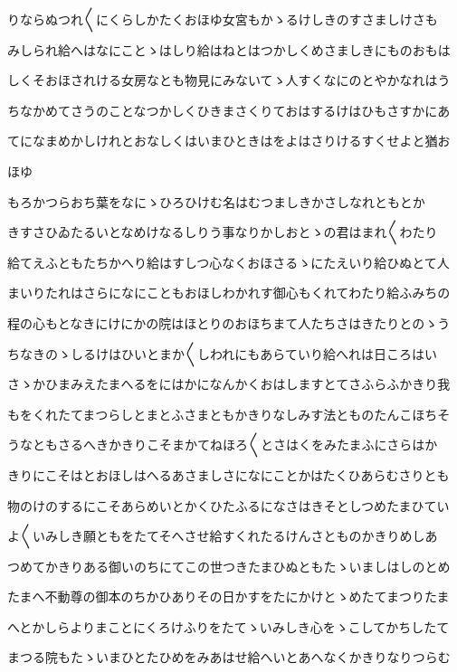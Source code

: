 \documentclass[a4paper,11pt,landscape]{ltjtarticle}
\begin{document}
\par\medskip
りならぬつれ〱にくらしかたくおほゆ女宮もかゝるけしきのすさましけさも
\par\medskip
みしられ給へはなにことゝはしり給はねとはつかしくめさましきにものおもは
\par\medskip
しくそおほされける女房なとも物見にみないてゝ人すくなにのとやかなれはう
\par\medskip
ちなかめてさうのことなつかしくひきまさくりておはするけはひもさすかにあ
\par\medskip
てになまめかしけれとおなしくはいまひときはをよはさりけるすくせよと猶お
\par\medskip
ほゆ
\par\medskip
もろかつらおち葉をなにゝひろひけむ名はむつましきかさしなれともとか
\par\medskip
きすさひゐたるいとなめけなるしりう事なりかしおとゝの君はまれ〱わたり
\par\medskip
給てえふともたちかへり給はすしつ心なくおほさるゝにたえいり給ひぬとて人
\par\medskip
まいりたれはさらになにこともおほしわかれす御心もくれてわたり給ふみちの
\par\medskip
程の心もとなきにけにかの院はほとりのおほちまて人たちさはきたりとのゝう
\par\medskip
ちなきのゝしるけはひいとまか〱しわれにもあらていり給へれは日ころはい
\par\medskip
さゝかひまみえたまへるをにはかになんかくおはしますとてさふらふかきり我
\par\medskip
もをくれたてまつらしとまとふさまともかきりなしみす法とものたんこほちそ
\par\medskip
うなともさるへきかきりこそまかてねほろ〱とさはくをみたまふにさらはか
\par\medskip
きりにこそはとおほしはへるあさましさになにことかはたくひあらむさりとも
\par\medskip
物のけのするにこそあらめいとかくひたふるになさはきそとしつめたまひてい
\par\medskip
よ〱いみしき願ともをたてそへさせ給すくれたるけんさとものかきりめしあ
\par\medskip
つめてかきりある御いのちにてこの世つきたまひぬともたゝいましはしのとめ
\par\medskip
たまへ不動尊の御本のちかひありその日かすをたにかけとゝめたてまつりたま
\par\medskip
へとかしらよりまことにくろけふりをたてゝいみしき心をゝこしてかちしたて
\par\medskip
まつる院もたゝいまひとたひめをみあはせ給へいとあへなくかきりなりつらむ
\end{document}
